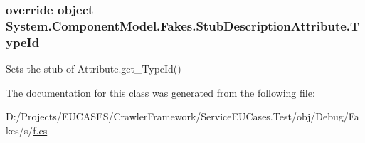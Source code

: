 \hypertarget{class_system_1_1_component_model_1_1_fakes_1_1_stub_description_attribute_ab9afc08045e303217327cab16032f6e9}{
\subsubsection[{Type\-Id}]{\setlength{\rightskip}{0pt plus 5cm}override object System.\-Component\-Model.\-Fakes.\-Stub\-Description\-Attribute.\-Type\-Id\hspace{0.3cm}{\ttfamily [get]}}}\label{class_system_1_1_component_model_1_1_fakes_1_1_stub_description_attribute_ab9afc08045e303217327cab16032f6e9}


Sets the stub of Attribute.\-get\-\_\-\-Type\-Id()



The documentation for this class was generated from the following file\-:\begin{DoxyCompactItemize}
\item 
D\-:/\-Projects/\-E\-U\-C\-A\-S\-E\-S/\-Crawler\-Framework/\-Service\-E\-U\-Cases.\-Test/obj/\-Debug/\-Fakes/s/\hyperlink{s_2f_8cs}{f.\-cs}\end{DoxyCompactItemize}

